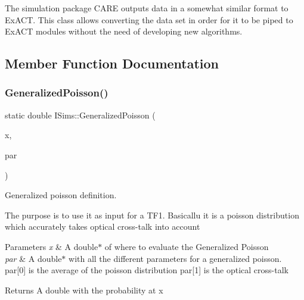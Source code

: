 The simulation package C\+A\+RE outputs data in a somewhat similar format to Ex\+A\+CT. This class allows converting the data set in order for it to be piped to Ex\+A\+CT modules without the need of developing new algorithms. 

\subsection{Member Function Documentation}
\mbox{\label{classISims_a1d3a8745f63eceae6a418bd749a9f4e3}} 
\subsubsection{\texorpdfstring{Generalized\+Poisson()}{GeneralizedPoisson()}}
{\footnotesize\ttfamily static double I\+Sims\+::\+Generalized\+Poisson (\begin{DoxyParamCaption}\item[{double $\ast$}]{x,  }\item[{double $\ast$}]{par }\end{DoxyParamCaption})\hspace{0.3cm}{\ttfamily [static]}}



Generalized poisson definition. 

The purpose is to use it as input for a T\+F1. Basicallu it is a poisson distribution which accurately takes optical cross-\/talk into account


\begin{DoxyParams}{Parameters}
{\em x} & A double$\ast$ of where to evaluate the Generalized Poisson \\
\hline
{\em par} & A double$\ast$ with all the different parameters for a generalized poisson. par\mbox{[}0\mbox{]} is the average of the poisson distribution par\mbox{[}1\mbox{]} is the optical cross-\/talk\\
\hline
\end{DoxyParams}
\begin{DoxyReturn}{Returns}
A double with the probability at x 
\end{DoxyReturn}
\mbox{\label{classISims_a4e7aee18de24c88f2c26be360d3764ed}} 
